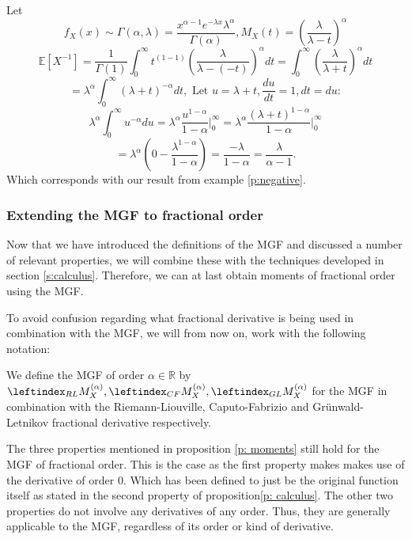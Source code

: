 \begin{example}
    Let \[f_X(x) \sim \Gamma(\alpha, \lambda) = 
    \frac{x^{\alpha -1} e^{-\lambda x} \lambda^\alpha} {\Gamma(\alpha)}, M_X(t) = \left(\frac{\lambda}{\lambda - t}\right)^\alpha\]
    \[\mathbb{E}[X^{-1}] = \frac{1}{\Gamma(1)} \int_{0}^{\infty} t^{( 1 - 1)} \left(\frac{\lambda}{\lambda - (-t)}\right)^\alpha dt =  \int_{0}^{\infty} \left(\frac{\lambda}{\lambda + t}\right)^\alpha dt\]
    \[ = \lambda^\alpha \int_{0}^{\infty} (\lambda + t)^{-\alpha} dt, \text{ Let } u = \lambda + t, \frac{du}{dt} = 1, dt = du:\]
    \[ \lambda^\alpha \int_{0}^{\infty} u^{-\alpha} du
    =  \lambda^\alpha \frac{u^{ 1-\alpha}}{1 -\alpha}\Big|_{0}^{\infty} = \lambda^\alpha \frac{(\lambda + t)^{1 -\alpha}}{1 -\alpha}\Big|_{0}^{\infty}\]
    \[= \lambda^\alpha\left( 0 - \frac{\lambda^{ 1 - \alpha}}{1 -\alpha}\right) = \frac{-\lambda}{ 1 - \alpha} = \frac{\lambda}{\alpha - 1}.\] Which corresponds with our result from example \ref{p:negative}.
\end{example}

\subsubsection{Extending the MGF to fractional order}
Now that we have introduced the definitions of the MGF and discussed a number of relevant properties, we will combine these with the techniques developed in section \ref{s:calculus}. Therefore, we can at last obtain moments of fractional order using the MGF.


To avoid confusion regarding what fractional derivative is being used in combination with the MGF, we will from now on, work with the following notation:
\begin{definition}\label{d: MGF}
    We define the MGF of order \(\alpha \in \mathbb{R}\) by \(\leftindex_{RL}{M}_X^{(\alpha)}, \leftindex_{CF}{M}_X^{(\alpha)}, \leftindex_{GL}{M}_X^{(\alpha)}\) for the MGF in combination with the Riemann-Liouville, Caputo-Fabrizio and Grünwald-Letnikov fractional derivative respectively.
\end{definition}
\begin{remark}
    The three properties mentioned in proposition \ref{p: moments} still hold for the MGF of fractional order. This is the case as the first property makes makes use of the derivative of order 0. Which has been defined to just be the original function itself as stated in the second property of proposition\ref{p: calculus}. The other two properties do not involve any derivatives of any order. Thus, they are generally applicable to the MGF, regardless of its order or kind of derivative.
\end{remark}

